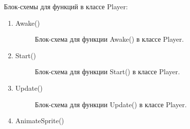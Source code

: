 \documentclass[14pt, oneside]{altsu-report}
\begin{document}
Блок-схемы для функций в классе Player:
\begin{enumerate}
\item Awake() 

\begin{figure}[H]
\caption{Блок-схема для функции Awake() в классе Player.}
\end{figure}

\item Start() 

\begin{figure}[H]
\caption{Блок-схема для функции Start() в классе Player.}
\end{figure}

\item Update() 

\begin{figure}[H]
\caption{Блок-схема для функции Update()  в классе Player.}
\end{figure}


\item AnimateSprite()


\end{enumerate}
\end{document}
